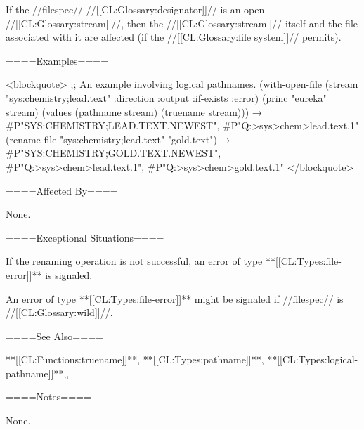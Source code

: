 If the //filespec// //[[CL:Glossary:designator]]// is an open //[[CL:Glossary:stream]]//, then the //[[CL:Glossary:stream]]// itself and the file associated with it are affected (if the //[[CL:Glossary:file system]]// permits).

====Examples====

<blockquote> ;; An example involving logical pathnames. (with-open-file (stream "sys:chemistry;lead.text" :direction :output :if-exists :error) (princ "eureka" stream) (values (pathname stream) (truename stream))) → #P"SYS:CHEMISTRY;LEAD.TEXT.NEWEST", #P"Q:>sys>chem>lead.text.1" (rename-file "sys:chemistry;lead.text" "gold.text") → #P"SYS:CHEMISTRY;GOLD.TEXT.NEWEST", #P"Q:>sys>chem>lead.text.1", #P"Q:>sys>chem>gold.text.1" </blockquote>

====Affected By====

None.

====Exceptional Situations====

If the renaming operation is not successful, an error of type **[[CL:Types:file-error]]** is signaled.

An error of type **[[CL:Types:file-error]]** might be signaled if //filespec// is //[[CL:Glossary:wild]]//.

====See Also====

**[[CL:Functions:truename]]**, **[[CL:Types:pathname]]**, **[[CL:Types:logical-pathname]]**,{\secref\FileSystemConcepts},

{\secref\PathnamesAsFilenames}

====Notes====

None.

    
